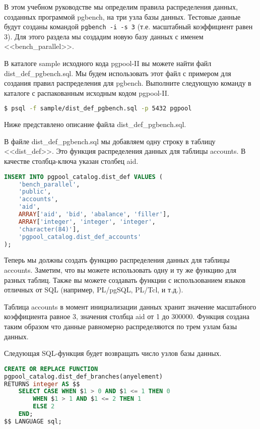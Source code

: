 В этом учебном руководстве мы определим правила распределения данных, созданных программой pgbench, на три узла базы данных. Тестовые данные будут созданы командой \lstinline!pgbench -i -s 3! (т.е. масштабный коэффициент равен 3). Для этого раздела мы создадим новую базу данных с именем <<bench\_parallel>>.

В каталоге sample исходного кода pgpool-II вы можете найти файл dist\_def\_pgbench.sql. Мы будем использовать этот файл с примером для создания правил распределения для pgbench. Выполните следующую команду в каталоге с распакованным исходным кодом pgpool-II.

\begin{lstlisting}[language=Bash,label=lst:pgpool32,caption=Установка правил распределения данных]
$ psql -f sample/dist_def_pgbench.sql -p 5432 pgpool
\end{lstlisting}

Ниже представлено описание файла dist\_def\_pgbench.sql.

В файле dist\_def\_pgbench.sql мы добавляем одну строку в таблицу <<dist\_def>>. Это функция распределения данных для таблицы accounts. В качестве столбца-ключа указан столбец aid.

\begin{lstlisting}[language=SQL,label=lst:pgpool33,caption=Установка правил распределения данных]
INSERT INTO pgpool_catalog.dist_def VALUES (
    'bench_parallel',
    'public',
    'accounts',
    'aid',
    ARRAY['aid', 'bid', 'abalance', 'filler'],
    ARRAY['integer', 'integer', 'integer',
    'character(84)'],
    'pgpool_catalog.dist_def_accounts'
);
\end{lstlisting}

Теперь мы должны создать функцию распределения данных для таблицы accounts. Заметим, что вы можете использовать одну и ту же функцию для разных таблиц. Также вы можете создавать функции с использованием языков отличных от SQL (например, PL/pgSQL, PL/Tcl, и т.д.).

Таблица accounts в момент инициализации данных хранит значение масштабного коэффициента равное 3, значения столбца aid от 1 до 300000. Функция создана таким образом что данные равномерно распределяются по трем узлам базы данных.

Следующая SQL-функция будет возвращать число узлов базы данных.

\begin{lstlisting}[language=SQL,label=lst:pgpool34,caption=Установка правил распределения данных]
CREATE OR REPLACE FUNCTION
pgpool_catalog.dist_def_branches(anyelement)
RETURNS integer AS $$
    SELECT CASE WHEN $1 > 0 AND $1 <= 1 THEN 0
        WHEN $1 > 1 AND $1 <= 2 THEN 1
        ELSE 2
    END;
$$ LANGUAGE sql;
\end{lstlisting}

